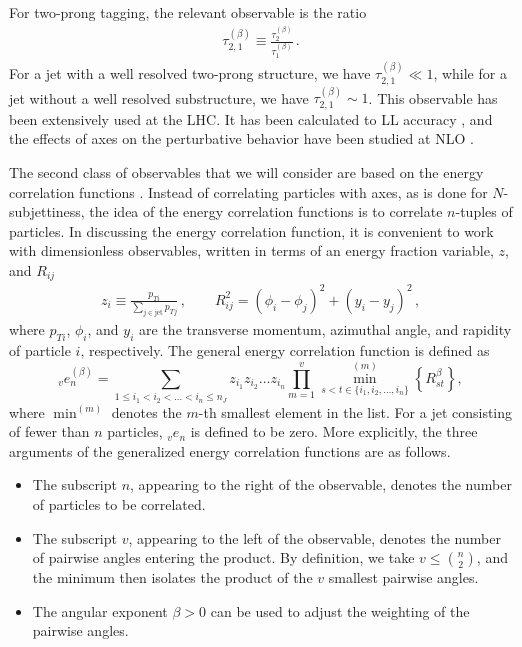 \documentclass[11pt,letterpaper]{article}
\DeclareRobustCommand{\Ref}[1]{Ref.~\cite{#1}}
\newcommand{\ecfvar}[3]{{_{#1}e_{#2}^{(#3)}}}
\newcommand{\ecfvarnobeta}[2]{{_{#1}e_{#2}}}
\newcommand{\Nsub}[2]{\tau_{#1}^{(#2)}}
\begin{document}
For two-prong tagging, the relevant observable is the ratio \cite{Thaler:2010tr}
\begin{align}
\Nsub{2,1}{\beta}\equiv \frac{\Nsub{2}{\beta}}{\Nsub{1}{\beta}}\,.
\end{align}
For a jet with a well resolved two-prong structure, we have $\Nsub{2,1}{\beta}\ll 1$, while for a jet without a well resolved substructure, we have $\Nsub{2,1}{\beta}\sim 1$.
This observable has been extensively used at the LHC. It has been calculated to LL accuracy \cite{Dasgupta:2015lxh}, and the effects of axes on the perturbative behavior have been studied at NLO \cite{Larkoski:2015uaa}.

The second class of observables that we will consider are based on the energy correlation functions \cite{Larkoski:2013eya}. Instead of correlating particles with axes, as is done for $N$-subjettiness, the idea of the energy correlation functions is to correlate $n$-tuples of particles.  In discussing the energy correlation function, it is convenient to work with dimensionless observables, written in terms of an energy fraction variable, $z$, and $R_{ij}$
\begin{align}\label{eq:ptratio}  
z_i\equiv\frac{p_{Ti}}{\sum_{j \in \text{jet}} p_{Tj}}\,, \qquad   R_{ij}^2 = (\phi_i-\phi_j)^2+(y_i-y_j)^2\,,
\end{align}
where $p_{Ti}$, $\phi_i$, and $y_i$ are the transverse momentum, azimuthal angle, and rapidity of particle $i$, respectively. 
The general energy correlation function is defined as
\begin{equation}\label{eq:ecf_gen}
\ecfvar{v}{n}{\beta} = \sum_{1 \leq i_1 < i_2 < \dots < i_n \leq n_J} z_{i_1} z_{i_2} \dots z_{i_n} \prod_{m = 1}^{v} \min^{(m)}_{s < t \in \{i_1, i_2 , \dots, i_n \}} \left\{ R_{st}^{\beta} \right\},
\end{equation}
where $\min^{(m)}$ denotes the $m$-th smallest element in the list.  For a jet consisting of fewer than $n$ particles, $\ecfvarnobeta{v}{n}$ is defined to be zero.  More explicitly, the three arguments of the generalized energy correlation functions are as follows.
\begin{itemize}
\item The subscript $n$, appearing to the right of the observable, denotes the number of particles to be correlated.   
\item The subscript $v$, appearing to the left of the observable, denotes the number of pairwise angles entering the product.  By definition, we take $v \leq \binom{n}{2}$, and the minimum then isolates the product of the $v$ smallest pairwise angles.
\item The angular exponent $\beta>0$ can be used to adjust the weighting of the pairwise angles.
\end{itemize}
\end{document}
